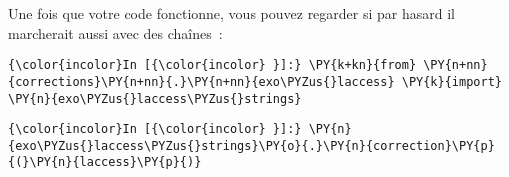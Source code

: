     Une fois que votre code fonctionne, vous pouvez regarder si par hasard
il marcherait aussi avec des chaînes~:

    \begin{Verbatim}[commandchars=\\\{\}]
{\color{incolor}In [{\color{incolor} }]:} \PY{k+kn}{from} \PY{n+nn}{corrections}\PY{n+nn}{.}\PY{n+nn}{exo\PYZus{}laccess} \PY{k}{import} \PY{n}{exo\PYZus{}laccess\PYZus{}strings}
\end{Verbatim}


    \begin{Verbatim}[commandchars=\\\{\}]
{\color{incolor}In [{\color{incolor} }]:} \PY{n}{exo\PYZus{}laccess\PYZus{}strings}\PY{o}{.}\PY{n}{correction}\PY{p}{(}\PY{n}{laccess}\PY{p}{)}
\end{Verbatim}